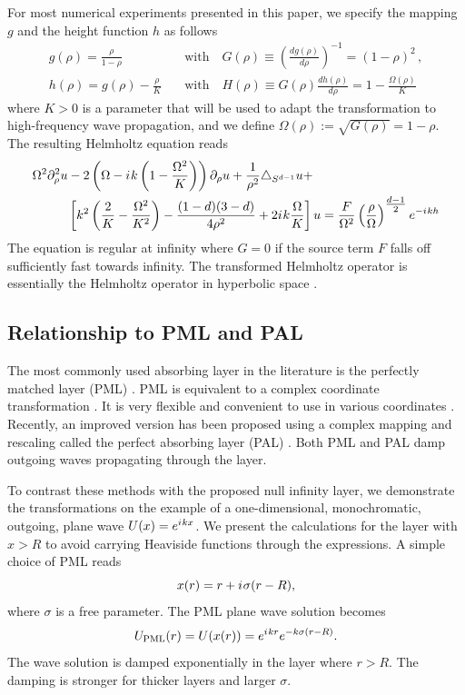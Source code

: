\documentclass[draft,onefignum,onetabnum]{siamart190516}
\newcommand{\be}{\begin{equation}}
\newcommand{\ee}{\end{equation}}
\newcommand{\iu}{{i\mkern1mu}}
\begin{document}
For most numerical experiments presented in this paper, we specify the mapping $g$ and the height function $h$ as follows
\begin{align} 
\label{eq:g}
g(\rho) = \frac{\rho}{1-\rho} \quad &\mathrm{with}\quad G(\rho) \equiv \left(\frac{d g(\rho)}{d\rho}\right)^{-1} = (1-\rho)^2\,, \\
\label{eq:h}
h(\rho) = g(\rho) - \frac{\rho}{K} \quad &\mathrm{with}\quad H(\rho) \equiv G(\rho) \frac{d h(\rho)}{d\rho} = 1 - \frac{\Omega(\rho)}{K} 
\end{align}
where $K>0$ is a parameter that will be used to adapt the transformation to high-frequency wave propagation, and we define $\Omega(\rho):=\sqrt{G(\rho)} = 1-\rho$. 
The resulting Helmholtz equation reads
\begin{align}\label{eq:hyp_specific}
	\Omega^2 \partial_\rho^2 u & - 2\left(\Omega - \iu k \left(1-\frac{\Omega^2}{K}\right)\right) \partial_\rho u + \frac{1}{\rho^2}\triangle_{S^{d-1}} u + \nonumber \\
	             & \left[k^2 \left( \frac{2}{K} - \frac{\Omega^2}{K^2} \right) - \frac{(1-d)(3-d)}{4 \rho^2} + 2 \iu k \frac{\Omega}{K} \right] u = \frac{F}{\Omega^2} \left(\frac{\rho}{\Omega}\right)^{\tfrac{d-1}{2}} e^{-\iu k h}
\end{align}
The equation is regular at infinity where $G=0$ if the source term $F$ falls off sufficiently fast towards infinity. The transformed Helmholtz operator is essentially the Helmholtz operator in hyperbolic space \cite{stoll2016harmonic}. 


\subsection{Relationship to PML and PAL}
The most commonly used absorbing layer in the literature is the perfectly matched layer (PML) \cite{BERENGER1994185}. PML is equivalent to a complex coordinate transformation \cite{chew19943d}. It is very flexible and convenient to use in various coordinates \cite{collino1998perfectly}. Recently, an improved version has been proposed using a complex mapping and rescaling called the perfect absorbing layer (PAL) \cite{wang2017perfect, yang2021truly}. Both PML and PAL damp outgoing waves propagating through the layer.

To contrast these methods with the proposed null infinity layer, we demonstrate the transformations on the example of a one-dimensional, monochromatic, outgoing, plane wave $U(x)=e^{\iu kx}$. We present the calculations for the layer with $x>R$ to avoid carrying Heaviside functions through the expressions. A simple choice of PML reads 
\be\label{eq:pml} x(r) = r + \iu \sigma (r-R), \ee
where $\sigma$ is a free parameter. The PML plane wave solution becomes
\[ U_{\mathrm{PML}}(r) = U(x(r)) = e^{\iu k r} e^{- k \sigma (r-R)}. \]
The wave solution is damped exponentially in the layer where $r>R$. The damping is stronger for thicker layers and larger $\sigma$.
\end{document}
